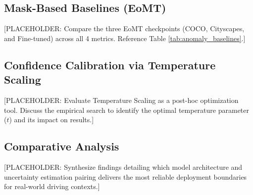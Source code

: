 \documentclass[10pt,conference]{IEEEtran}
\begin{document}
\subsection{Mask-Based Baselines (EoMT)}
[PLACEHOLDER: Compare the three EoMT checkpoints (COCO, Cityscapes, and Fine-tuned) across all 4 metrics. Reference Table \ref{tab:anomaly_baselines}.]

\subsection{Confidence Calibration via Temperature Scaling}
[PLACEHOLDER: Evaluate Temperature Scaling as a post-hoc optimization tool. Discuss the empirical search to identify the optimal temperature parameter ($t$) and its impact on results.]

\subsection{Comparative Analysis}
[PLACEHOLDER: Synthesize findings detailing which model architecture and uncertainty estimation pairing delivers the most reliable deployment boundaries for real-world driving contexts.]
\end{document}
